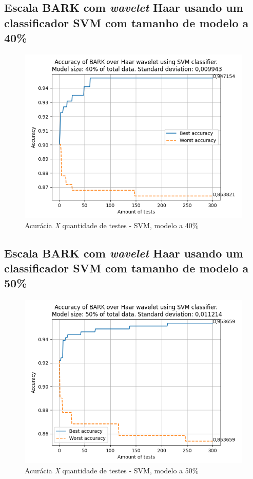 		\newpage
		\subsection{Escala BARK com \textit{wavelet} Haar usando um classificador SVM com tamanho de modelo a 40\%}
			\begin{figure}[ht]
				\centering
				\includegraphics{images/results/confusionMatrices/classifier_SVM_40.png}
				\caption{Acurácia \textit{X} quantidade de testes - SVM, modelo a 40\%}
				\label{fig:classifiersvm40}
			\end{figure}
			
	
		\newpage
		\subsection{Escala BARK com \textit{wavelet} Haar usando um classificador SVM com tamanho de modelo a 50\%}
			\begin{figure}[ht]
				\centering
				\includegraphics{images/results/confusionMatrices/classifier_SVM_50.png}
				\caption{Acurácia \textit{X} quantidade de testes - SVM, modelo a 50\%}
				\label{fig:classifiersvm50}
			\end{figure}
			

